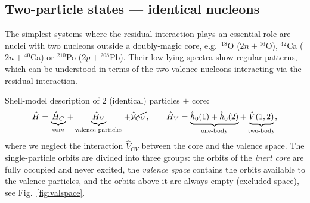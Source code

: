 \documentclass[11pt,a4paper]{article}
\newcommand{\op}[1]{\hat{#1}}
\begin{document}
\subsection{Two-particle states --- identical nucleons}

The simplest systems where the residual interaction plays an essential role are nuclei with two nucleons outside a doubly-magic core, e.g.\ ${}^{18}$O ($2n+{}^{16}$O), ${}^{42}$Ca ($2n+{}^{40}$Ca) or ${}^{210}$Po ($2p+{}^{208}$Pb). Their low-lying spectra show regular patterns, which can be understood in terms of the two valence nucleons interacting via the residual interaction.

Shell-model description of 2 (identical) particles $+$ core:
\[
\op H=\underbrace{\op H_C}_{\text{core}}+\underbrace{\op H_V}_{\text{valence particles}}+\cancel{\op V_{CV}},
\qquad
\op H_V=\underbrace{\op h_0(1)+\op h_0(2)}_{\text{one-body}}+\underbrace{\op V(1,2)}_{\text{two-body}},
\]
where we neglect the interaction $\op V_{CV}$ between the core and the valence space.
The single-particle orbits are divided into three groups: the orbits of the \emph{inert core} are fully occupied and never excited, the \emph{valence space} contains the orbits available to the valence particles, and the orbits above it are always empty (excluded space), see Fig.~\ref{fig:valspace}.
\end{document}

